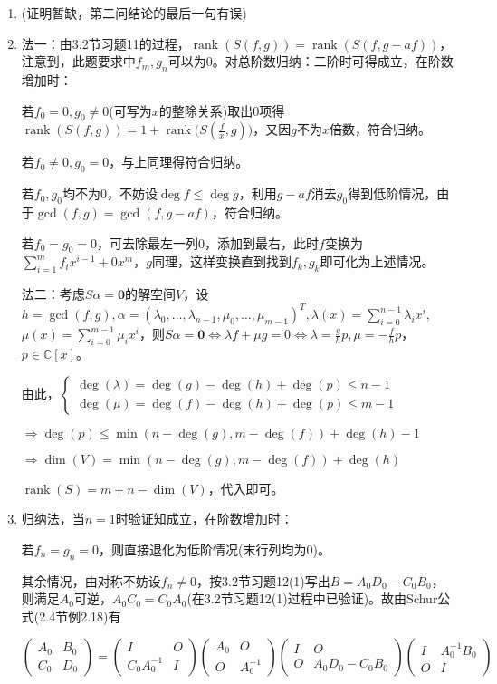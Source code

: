 \documentclass[a4paper,UTF8,fontset=windows]{ctexart}
\DeclareMathOperator{\rank}{rank}
\begin{document}
\begin{enumerate}
\item
(证明暂缺，第二问结论的最后一句有误)

\item
法一：由3.2节习题11的过程，$\rank(S(f,g))=\rank(S(f,g-af))$，注意到，此题要求中$f_m,g_n$可以为0。对总阶数归纳：二阶时可得成立，在阶数增加时：

若$f_0=0,g_0\ne0$(可写为$x$的整除关系)取出0项得$\rank(S(f,g))=1+\rank\big(S(\frac{f}{x},g)\big)$，又因$g$不为$x$倍数，符合归纳。

若$f_0\ne0,g_0=0$，与上同理得符合归纳。

若$f_0,g_0$均不为0，不妨设$\deg{f}\le\deg{g}$，利用$g-af$消去$g_0$得到低阶情况，由于$\gcd(f,g)=\gcd(f,g-af)$，符合归纳。

若$f_0=g_0=0$，可去除最左一列0，添加到最右，此时$f$变换为$\sum_{i=1}^{m}f_ix^{i-1}+0x^m$，$g$同理，这样变换直到找到$f_k,g_k$即可化为上述情况。

法二：考虑$S\alpha=\mathbf{0}$的解空间$V$，设$h=\gcd(f,g),\alpha=(\lambda_0,\dots,\lambda_{n-1},\mu_0,\dots,\mu_{m-1})^T, \lambda(x)=\sum_{i=0}^{n-1}\lambda_ix^i,$ $\mu(x)=\sum_{i=0}^{m-1}\mu_ix^i$，则$S\alpha=\mathbf{0}\Leftrightarrow\lambda f+\mu g=0\Leftrightarrow\lambda=\frac{g}{h}p,\mu=-\frac{f}{h}p$，$p\in\mathbb{C}[x]$。

由此，$\begin{cases}\deg(\lambda)=\deg(g)-\deg(h)+\deg(p)\le n-1\\\deg(\mu)=\deg(f)-\deg(h)+\deg(p)\le m-1\end{cases}$

$\Rightarrow\deg(p)\le\min(n-\deg(g),m-\deg(f))+\deg(h)-1$

$\Rightarrow\dim(V)=\min(n-\deg(g),m-\deg(f))+\deg(h)$

$\rank(S)=m+n-\dim(V)$，代入即可。

\item
归纳法，当$n=1$时验证知成立，在阶数增加时：

若$f_n=g_n=0$，则直接退化为低阶情况(末行列均为0)。

其余情况，由对称不妨设$f_n\ne0$，按3.2节习题12(1)写出$B=A_0D_0-C_0B_0$，则满足$A_0$可逆，$A_0C_0=C_0A_0$(在3.2节习题12(1)过程中已验证)。故由Schur公式(2.4节例2.18)有

$\begin{pmatrix}A_0&B_0\\C_0&D_0\end{pmatrix}=\begin{pmatrix}I&O\\C_0A_0^{-1}&I\end{pmatrix}\begin{pmatrix}A_0&O\\O&A_0^{-1}\end{pmatrix}\begin{pmatrix}I&O\\O&A_0D_0-C_0B_0\end{pmatrix}\begin{pmatrix}I&A_0^{-1}B_0\\O&I\end{pmatrix}$


\end{enumerate}
\end{document}
